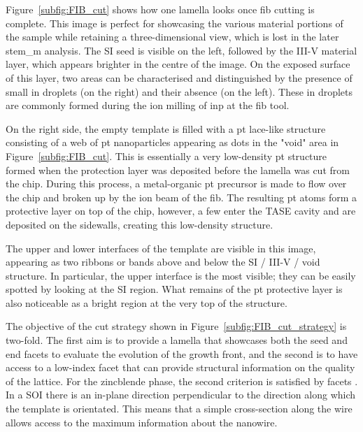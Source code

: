 Figure~\ref{subfig:FIB_cut} shows how one lamella looks once \acs{fib} cutting is complete. This image is perfect for showcasing the various material portions of the sample while retaining a three-dimensional view, which is lost in the later \acs{stem_m} analysis. The \acl{SI} seed is visible on the left, followed by the III-V material layer, which appears brighter in the centre of the image. On the exposed surface of this layer, two areas can be characterised and distinguished by the presence of small \acl{in} droplets (on the right) and their absence (on the left). These \acl{in} droplets are commonly formed during the ion milling of \acl{inp} at the \acs{fib} tool. 

On the right side, the empty template is filled with a \acl{pt} lace-like structure consisting of a web of \acl{pt} nanoparticles appearing as dots in the "void" area in Figure~\ref{subfig:FIB_cut}. This is essentially a very low-density \acl{pt} structure formed when the protection layer was deposited before the lamella was cut from the chip. During this process, a metal-organic \acl{pt} precursor is made to flow over the chip and broken up by the ion beam of the \acs{fib}. The resulting \acl{pt} atoms form a protective layer on top of the chip, however, a few enter the \acs{TASE} cavity and are deposited on the sidewalls, creating this low-density structure.

The upper and lower interfaces of the template are visible in this image, appearing as two ribbons or bands above and below the \acl{SI} / III-V / void structure. In particular, the upper interface is the most visible; they can be easily spotted by looking at the \acl{SI} region. What remains of the \acl{pt} protective layer is also noticeable as a bright region at the very top of the structure.

The objective of the cut strategy shown in Figure~\ref{subfig:FIB_cut_strategy} is two-fold. The first aim is to provide a lamella that showcases both the seed and end facets to evaluate the evolution of the growth front, and the second is to have access to a low-index facet that can provide structural information on the quality of the lattice. For the zincblende phase, the second criterion is satisfied by  facets \cite{Dasilva2017}. In a  \acs{SOI} there is an in-plane \hkl[-1 1 0] direction perpendicular to the \hkl[1 1 0] direction along which the template is orientated. This means that a simple cross-section along the wire allows access to the maximum information about the nanowire.

